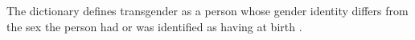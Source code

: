 The dictionary defines transgender as a person whose gender identity differs 
from the sex the person had or was identified as having at birth 
\cite{transgender-def}.
